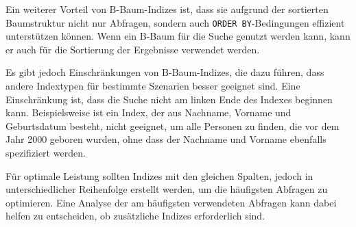 Ein weiterer Vorteil von B-Baum-Indizes ist, dass sie aufgrund der sortierten Baumstruktur nicht nur Abfragen, sondern auch \texttt{ORDER BY}-Bedingungen effizient unterstützen können.
Wenn ein B-Baum für die Suche genutzt werden kann, kann er auch für die Sortierung der Ergebnisse verwendet werden.

Es gibt jedoch Einschränkungen von B-Baum-Indizes, die dazu führen, dass andere Indextypen für bestimmte Szenarien besser geeignet sind.
Eine Einschränkung ist, dass die Suche nicht am linken Ende des Indexes beginnen kann.
Beispielsweise ist ein Index, der aus Nachname, Vorname und Geburtsdatum besteht, nicht geeignet, um alle Personen zu finden, die vor dem Jahr 2000 geboren wurden, ohne dass der Nachname und Vorname ebenfalls spezifiziert werden.

Für optimale Leistung sollten Indizes mit den gleichen Spalten, jedoch in unterschiedlicher Reihenfolge erstellt werden, um die häufigsten Abfragen zu optimieren.
Eine Analyse der am häufigsten verwendeten Abfragen kann dabei helfen zu entscheiden, ob zusätzliche Indizes erforderlich sind.



